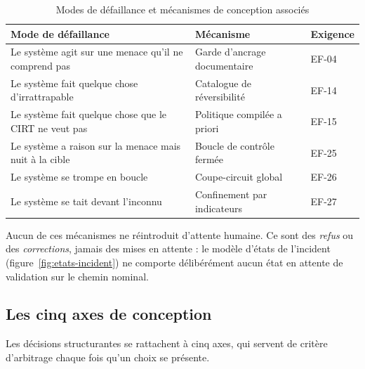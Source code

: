 \begin{table}[H]
\centering
\caption{Modes de d\'efaillance et m\'ecanismes de conception associ\'es}
\label{tab:modes-defaillance}
\small
\begin{tabular}{@{}p{5.6cm}p{4.4cm}p{3.6cm}@{}}
\toprule
\textbf{Mode de d\'efaillance} & \textbf{M\'ecanisme} & \textbf{Exigence} \\
\midrule
Le syst\`eme agit sur une menace qu'il ne comprend pas & Garde d'ancrage documentaire & EF-04 \\
Le syst\`eme fait quelque chose d'irrattrapable & Catalogue de r\'eversibilit\'e & EF-14 \\
Le syst\`eme fait quelque chose que le CIRT ne veut pas & Politique compil\'ee a priori & EF-15 \\
Le syst\`eme a raison sur la menace mais nuit \`a la cible & Boucle de contr\^ole ferm\'ee & EF-25 \\
Le syst\`eme se trompe en boucle & Coupe-circuit global & EF-26 \\
Le syst\`eme se tait devant l'inconnu & Confinement par indicateurs & EF-27 \\
\bottomrule
\end{tabular}
\end{table}

Aucun de ces m\'ecanismes ne r\'eintroduit d'attente humaine. Ce sont des
\emph{refus} ou des \emph{corrections}, jamais des mises en attente : le mod\`ele
d'\'etats de l'incident (figure~\ref{fig:etats-incident}) ne comporte d\'elib\'er\'ement
aucun \'etat \og en attente de validation \fg{} sur le chemin nominal.

\subsection{Les cinq axes de conception}
\label{sec:axes}
Les d\'ecisions structurantes se rattachent \`a cinq axes, qui servent de crit\`ere
d'arbitrage chaque fois qu'un choix se pr\'esente.

